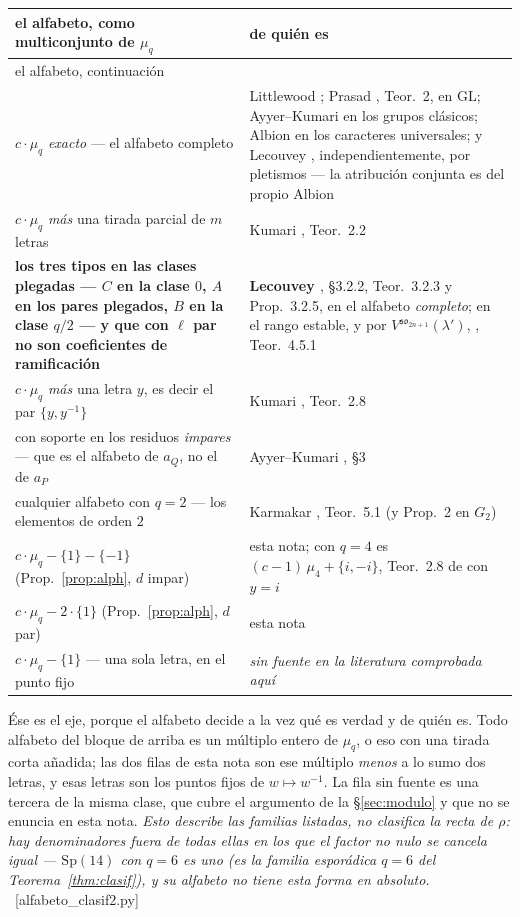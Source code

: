 \documentclass[11pt,a4paper]{article}
\newcommand{\Sp}{\mathrm{Sp}}
\newcommand{\GL}{\mathrm{GL}}
\newcommand{\ver}[1]{\unskip\penalty0\ \textcolor{azul}{\small\textsf{[#1]}}}
\begin{document}
{\small
{}
\begin{longtable}{@{}p{}p{}@{}}
\toprule
\rowcolor{cabecera}el alfabeto, como multiconjunto de $\mu_q$ & de quién es\\
\midrule
\endfirsthead
\toprule
\rowcolor{cabecera}el alfabeto, continuación & \\
\midrule
\endhead
$c\cdot\mu_q$ \emph{exacto} --- el alfabeto completo
 & Littlewood \cite{Li40}; Prasad \cite{Prasad16b}, Teor.~2, en $\GL$;
   Ayyer--Kumari \cite{AK22} en los grupos clásicos; Albion \cite{Alb23} en los caracteres
   universales; y Lecouvey \cite{Lec07a,Lec07b}, independientemente, por pletismos --- la
   atribución conjunta es del propio Albion \cite{Alb25}\\
$c\cdot\mu_q$ \emph{más} una tirada parcial de $m$ letras & Kumari \cite{Kum24}, Teor.~2.2\\
\textbf{los tres tipos en las clases plegadas --- $C$ en la clase $0$, $A$ en los pares plegados,
$B$ en la clase $q/2$ --- y que con $\ell$ par no son coeficientes de ramificación}
 & \textbf{Lecouvey \cite{Lec07a}}, \S3.2.2, Teor.~3.2.3 y Prop.~3.2.5, en el alfabeto
   \emph{completo}; en el rango estable, y por $V^{\mathfrak{so}_{2n+1}}(\lambda')$,
   \cite{Lec07b}, Teor.~4.5.1\\
$c\cdot\mu_q$ \emph{más} una letra $y$, es decir el par $\{y,y^{-1}\}$ & Kumari \cite{Kum24}, Teor.~2.8\\
con soporte en los residuos \emph{impares} --- que es el alfabeto de $a_Q$, no el de $a_P$
 & Ayyer--Kumari \cite{AK25}, \S3\\
cualquier alfabeto con $q=2$ --- los elementos de orden $2$ & Karmakar \cite{Kar24}, Teor.~5.1 (y Prop.~2 en $G_2$)\\
\midrule
\rowcolor{marca}$c\cdot\mu_q-\{1\}-\{-1\}$ (Prop.~\ref{prop:alph}, $d$ impar) & esta nota; con $q=4$ es $(c-1)\,\mu_4+\{i,-i\}$, Teor.~2.8 de \cite{Kum24} con $y=i$\\
\rowcolor{marca}$c\cdot\mu_q-2\cdot\{1\}$ (Prop.~\ref{prop:alph}, $d$ par) & esta nota\\
\midrule
$c\cdot\mu_q-\{1\}$ --- una sola letra, en el punto fijo
 & \emph{sin fuente en la literatura comprobada aquí}\\
\bottomrule
\end{longtable}}

\vspace{4pt}
\noindent Ése es el eje, porque el alfabeto decide a la vez qué es verdad y de quién es. Todo
alfabeto del bloque de arriba es un múltiplo entero de $\mu_q$, o eso con una tirada corta
añadida; las dos filas de esta nota son ese múltiplo \emph{menos} a lo sumo dos letras, y esas
letras son los puntos fijos de $w\mapsto w^{-1}$. La fila sin fuente es una tercera de la misma
clase, que cubre el argumento de la \S\ref{sec:modulo} y que no se enuncia en esta nota.
\emph{Esto describe las familias listadas, no clasifica la recta de $\rho$: hay denominadores
fuera de todas ellas en los que el factor no nulo se cancela igual --- $\Sp(14)$ con $q=6$ es
uno (es la familia esporádica $q=6$ del Teorema~\ref{thm:clasif}), y su alfabeto no tiene esta forma en absoluto.} \ver{alfabeto\_clasif2.py}
\end{document}
